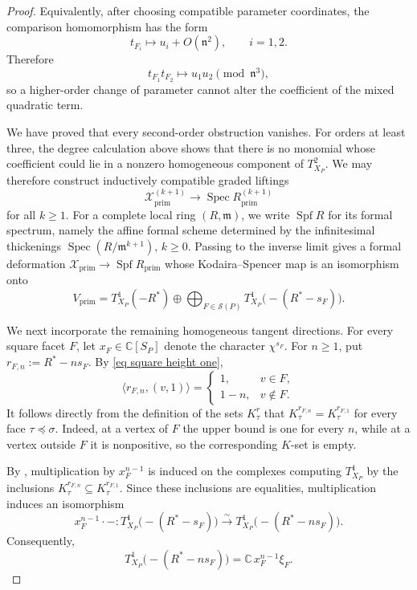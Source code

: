 \documentclass[11pt]{amsart}
\numberwithin{equation}{section}
\theoremstyle{plain}
\theoremstyle{definition}
\newcommand{\0}{$0$-mutable}
\newcommand{\CC}{\ensuremath{\mathbb{C}}}
\renewcommand{\1}{$1$-rigid}
\renewcommand{\0}{$0$-mutable}
\begin{document}
\begin{proof}
Equivalently, after choosing compatible parameter coordinates, the
comparison homomorphism has the form
\[
t_{F_i}\longmapsto u_i+O(\mathfrak n^2),
\qquad i=1,2.
\]
Therefore
\[
t_{F_1}t_{F_2}
\longmapsto
u_1u_2
\pmod{\mathfrak n^3},
\]
so a higher-order change of parameter cannot alter the coefficient of
the mixed quadratic term.

We have proved that every second-order obstruction vanishes. For
orders at least three, the degree calculation above shows that there
is no monomial whose coefficient could lie in a nonzero homogeneous
component of \(T^2_{X_P}\). We may therefore construct inductively
compatible graded liftings
\[
\mathcal X_{\mathrm{prim}}^{(k+1)}
\longrightarrow
\operatorname{Spec}R_{\mathrm{prim}}^{(k+1)}
\]
for all \(k\geq1\). 
{For a complete local ring \((R,\mathfrak m)\), we write
\(\operatorname{Spf}R\) for its formal spectrum, namely the affine
formal scheme determined by the infinitesimal thickenings
\(\operatorname{Spec}(R/\mathfrak m^{k+1})\), \(k\geq0\).}
Passing to the inverse limit gives a formal
deformation
$
\mathcal X_{\mathrm{prim}}
\longrightarrow
\operatorname{Spf}R_{\mathrm{prim}}
$
whose Kodaira--Spencer map is an isomorphism onto
\[
V_{\mathrm{prim}}
=
T^1_{X_P}(-R^*)
\oplus
\bigoplus_{F\in\mathcal S(P)}
T^1_{X_P}\bigl(-(R^*-s_F)\bigr).
\]

We next incorporate the remaining homogeneous tangent directions.
For every square facet \(F\), let
$
x_F\in\CC[S_P]
$
denote the character \(\chi^{s_F}\). For \(n\geq1\), put
$
r_{F,n}:=R^*-ns_F.
$
By \eqref{eq square height one},
\[
\langle r_{F,n},(v,1)\rangle
=
\begin{cases}
1,   & v\in F,\\
1-n, & v\notin F.
\end{cases}
\]
It follows directly from the definition of the sets \(K_\tau^r\)
that
$
K_\tau^{r_{F,n}}
=
K_\tau^{r_{F,1}}
$
for every face \(\tau\preceq\sigma\). Indeed, at a vertex of \(F\)
the upper bound is one for every \(n\), while at a vertex outside
\(F\) it is nonpositive, so the corresponding \(K\)-set is empty.

By \cite[Theorem~3.3]{AS98}, multiplication by \(x_F^{n-1}\) is
induced on the complexes computing \(T^1_{X_P}\) by the inclusions
$
K_\tau^{r_{F,n}}
\subseteq
K_\tau^{r_{F,1}}.
$
Since these inclusions are equalities, multiplication induces an
isomorphism
\[
x_F^{n-1}\cdot-
\colon
T^1_{X_P}\bigl(-(R^*-s_F)\bigr)
\xrightarrow{\ \sim\ }
T^1_{X_P}\bigl(-(R^*-ns_F)\bigr).
\]
Consequently,
\begin{equation}
\label{eq higher tangent generator}
T^1_{X_P}\bigl(-(R^*-ns_F)\bigr)
=
\CC\,x_F^{n-1}\xi_F.
\end{equation}


\end{proof}
\end{document}
